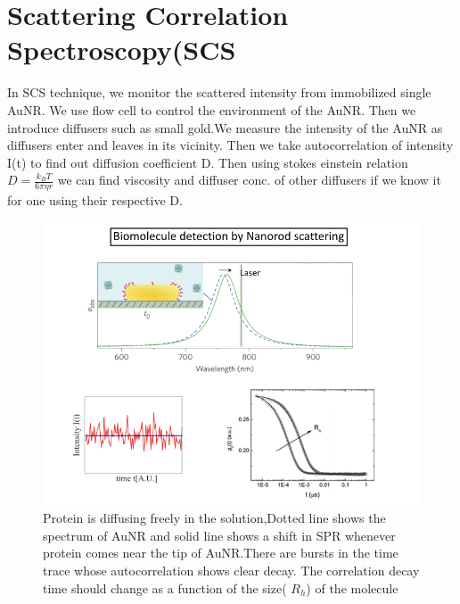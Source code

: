 \documentclass[twoside,single]{lion-msc}
\begin{document}
\newpage
\section{Scattering Correlation Spectroscopy(SCS}
In SCS technique\cite{AuNR1}, we monitor the scattered intensity from immobilized single AuNR. We use flow cell to control the environment of the AuNR. Then we introduce diffusers such as small gold.We measure the intensity of the AuNR as diffusers enter and leaves in its vicinity. Then we take autocorrelation of intensity I(t) to find out diffusion coefficient D. Then using stokes einstein relation $ D = \frac{k_B{T}}{6\pi\eta{r}}$ we can find viscosity and diffuser conc. of other diffusers if we know it for one using their respective D.

\begin{figure}[H]
\includegraphics[width=1\textwidth,left]{13}
\caption {Protein is diffusing freely in the solution,Dotted line shows the spectrum of AuNR and solid line shows a shift in SPR whenever protein comes near the tip of AuNR.There are bursts in the time trace whose autocorrelation shows clear decay. The correlation decay time should change as a function of the size( $R_h$) of the molecule \cite{AuNR4}}
\end{figure}
\end{document}
